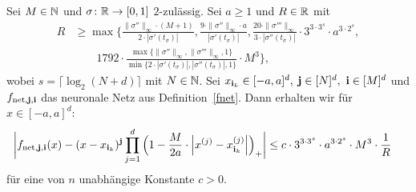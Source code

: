 \begin{lem}
\label{lem:5}
Sei $M \in \mathbb{N}$ und $\sigma\colon \mathbb{R} \to [0, 1]$ $2$-zulässig.
Sei $a \geq 1$ und $R \in \mathbb{R}$ mit
\begin{equation*}
\begin{split}
R & \geq \max\biggl\{\frac{\|\sigma''\|_{\infty} \cdot (M + 1)}{2 \cdot |\sigma'(t_{\sigma})|}, \frac{9 \cdot \|\sigma''\|_{\infty} \cdot a}{|\sigma'(t_{\sigma})|}, \frac{20 \cdot \|\sigma'''\|_{\infty}}{3 \cdot |\sigma''(t_{\sigma})|} \cdot 3^{3 \cdot 3^s} \cdot a^{3 \cdot 2^s}, \\[0.5em]
& \qquad 1792 \cdot \frac{\max\{\|\sigma''\|_{\infty},\|\sigma'''\|_{\infty}, 1\}}{\min\{2 \cdot |\sigma'(t_{\sigma})|, |\sigma''(t_{\sigma})|, 1\}} \cdot M^3 \biggr\},
\end{split}
\end{equation*}
wobei $s = \lceil\log_2(N + d)\rceil$ mit $N \in \mathbb{N}$. Sei $x_{{\mathbf{i}}_k} \in [-a, a]^d,$ $\mathbf{j} \in [N]^d,$ $\mathbf{i} \in [M]^d$ und $f_{\mathrm{net},\mathbf{j},\mathbf{i}}$ das neuronale Netz aus Definition~\ref{fnet}.
Dann erhalten wir für $x \in [-a, a]^d$:
\begin{equation*}
\begin{split}
& \bigg|f_{\mathrm{net},\mathbf{j},\mathbf{i}}(x) - (x - x_{\mathbf{i}_k})^{\mathbf{j}} \prod_{j = 1}^d \Big(1 - \frac{M}{2a} \cdot \Big|x^{(j)} - x_{\mathbf{i}_k}^{(j)}\Big|\Big)_+\bigg| \leq c \cdot 3^{3 \cdot 3^s} \cdot a^{3 \cdot 2^s} \cdot M^3 \cdot \frac{1}{R}
\end{split}
\end{equation*}
für eine von $n$ unabhängige Konstante $c > 0$.
\end{lem} 
 
